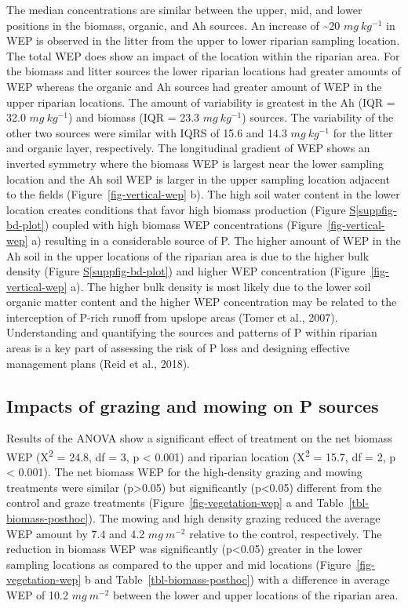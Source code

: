 \documentclass[
]{agujournal2019}
\newcommand*\quartosuppfigref[1]{Figure \hyperref[#1]{S\ref{#1}}}
\begin{document}
The median concentrations are similar between the upper, mid, and lower
positions in the biomass, organic, and Ah sources. An increase of
\textasciitilde20 \(mg~kg^{-1}\) in WEP is observed in the litter from
the upper to lower riparian sampling location. The total WEP does show
an impact of the location within the riparian area. For the biomass and
litter sources the lower riparian locations had greater amounts of WEP
whereas the organic and Ah sources had greater amount of WEP in the
upper riparian locations. The amount of variability is greatest in the
Ah (IQR = 32.0 \(mg~kg^{-1}\)) and biomass (IQR = 23.3 \(mg~kg^{-1}\))
sources. The variability of the other two sources were similar with IQRS
of 15.6 and 14.3 \(mg~kg^{-1}\) for the litter and organic layer,
respectively. The longitudinal gradient of WEP shows an inverted
symmetry where the biomass WEP is largest near the lower sampling
location and the Ah soil WEP is larger in the upper sampling location
adjacent to the fields (Figure~\ref{fig-vertical-wep} b). The high soil
water content in the lower location creates conditions that favor high
biomass production (\quartosuppfigref{suppfig-bd-plot}) coupled with
high biomass WEP concentrations (Figure~\ref{fig-vertical-wep} a)
resulting in a considerable source of P. The higher amount of WEP in the
Ah soil in the upper locations of the riparian area is due to the higher
bulk density (\quartosuppfigref{suppfig-bd-plot}) and higher WEP
concentration (Figure~\ref{fig-vertical-wep} a). The higher bulk density
is most likely due to the lower soil organic matter content and the
higher WEP concentration may be related to the interception of P-rich
runoff from upslope areas (Tomer et al., 2007). Understanding and
quantifying the sources and patterns of P within riparian areas is a key
part of assessing the risk of P loss and designing effective management
plans (Reid et al., 2018).

\subsection{Impacts of grazing and mowing on P
sources}\label{impacts-of-grazing-and-mowing-on-p-sources}

Results of the ANOVA show a significant effect of treatment on the net
biomass WEP (X\textsuperscript{2} = 24.8, df = 3, p \textless{} 0.001)
and riparian location (X\textsuperscript{2} = 15.7, df = 2, p
\textless{} 0.001). The net biomass WEP for the high-density grazing and
mowing treatments were similar (p\textgreater0.05) but significantly
(p\textless0.05) different from the control and graze treatments
(Figure~\ref{fig-vegetation-wep} a and Table~\ref{tbl-biomass-posthoc}).
The mowing and high density grazing reduced the average WEP amount by
7.4 and 4.2 \(mg~m^{-2}\) relative to the control, respectively. The
reduction in biomass WEP was significantly (p\textless0.05) greater in
the lower sampling locations as compared to the upper and mid locations
(Figure~\ref{fig-vegetation-wep} b and Table~\ref{tbl-biomass-posthoc})
with a difference in average WEP of 10.2 \(mg~m^{-2}\) between the lower
and upper locations of the riparian area.
\end{document}
